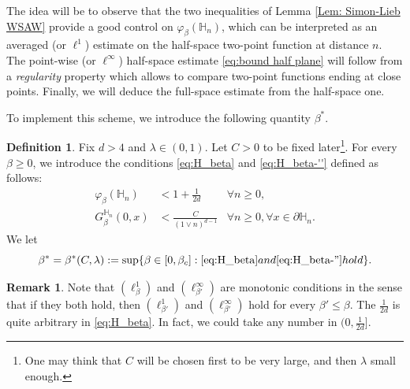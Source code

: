 \documentclass[11pt,a4paper]{article}
\numberwithin{equation}{section}
\theoremstyle{plain}
\theoremstyle{definition}
\newtheorem{Def}[Thm]{Definition}
\newtheorem{Rem}[Thm]{Remark}
\begin{document}
The idea will be to observe that the two inequalities of Lemma \ref{Lem: Simon-Lieb WSAW} provide a good control on $\varphi_\beta(\mathbb H_n)$, which can be interpreted as an averaged (or $\ell^1$) estimate on the half-space two-point function at distance $n$. The point-wise (or $\ell^\infty$) half-space estimate \eqref{eq:bound half plane} will follow from a \emph{regularity} property which allows to compare two-point functions ending at close points. Finally, we will deduce the full-space estimate from the half-space one.

To implement this scheme, we introduce the following quantity $\beta^*$.


\begin{Def} Fix $d>4$ and $\lambda\in(0,1)$. Let $C>0$ to be fixed later\footnote{One may think that $C$ will be chosen first to be very large, and then $\lambda$ small enough.}. For every $\beta\geq 0$, we introduce the conditions \eqref{eq:H_beta} and \eqref{eq:H_beta-''} defined as follows:
\begin{align}%
\varphi_\beta(\mathbb H_n)&< 1+\frac{1}{2d} &\forall n\ge0,\label{eq:H_beta}\tag{$\ell^1_\beta$}\\
 G_\beta^{\mathbb H_n}(0,x)&< \frac{C}{(1\vee n)^{d-1}} &\forall n\ge0,\forall x\in\partial\mathbb H_n\label{eq:H_beta-''}\tag{$\ell^\infty_\beta$}.
\end{align}
We let 
\begin{equation}
\beta^*=\beta^*(C,\lambda):=\sup\{\beta \in [0,\beta_c]: \textup{\eqref{eq:H_beta} and \eqref{eq:H_beta-''} hold}\}.\end{equation}

\end{Def}


\begin{Rem}
Note that $(\ell^1_{\beta})$ and $(\ell^\infty_{\beta'})$ are monotonic conditions in the sense that if they both hold, then $(\ell^1_{\beta'})$ and $(\ell^\infty_{\beta'})$ hold for every $\beta'\leq \beta$. The $\tfrac{1}{2d}$ is quite arbitrary in \eqref{eq:H_beta}. In fact, we could take any number in $(0,\tfrac{1}{2d}]$. 
\end{Rem}
\end{document}
